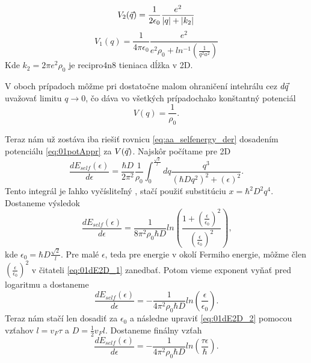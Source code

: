 \begin{equation}
\label{eq:01pot2D}
V_2(\vec{q})=\frac{1}{2\epsilon_0}\frac{e^2}{|q|+|k_2|}
\end{equation}
\begin{equation}
\label{eq:01pot1D}
V_1(q)=\frac{1}{4\pi\epsilon_0}\frac{e^2}{e^2\rho_0+ln^{-1}(\frac{1}{q^2a^2})}
\end{equation}
Kde  $k_2=2\pi e^2 \rho_0$  je recipro4n8 tieniaca dĺžka v 2D.  

V oboch prípadoch môžme pri dostatočne malom ohraničení intehrálu cez $d\vec{q}$ 
uvažovať limitu $q \to 0$, čo dáva vo všetkých prípadochako konštantný potenciál 
\begin{equation}
\label{eq:01potAppr}
V(q)=\frac{1}{\rho_0} \text{.}
\end{equation}

Teraz nám už zostáva iba riešiť rovnicu \eqref{eq:aa_selfenergy_der} dosadením potenciálu
\eqref{eq:01potAppr} za $V(\vec{q})$. Najskôr počítame pre 2D
\begin{equation}
 \frac{dE_{self}(\epsilon)}{d\epsilon}= \frac{\hbar D}{2\pi^2}\frac{1}{\rho_0} \int_0^{\frac{\sqrt{2}}{l}} dq \frac{ q^3}{(\hbar Dq^2)^2+(\epsilon)^2} \text{.}
\end{equation}
Tento integrál je ľahko vyčísliteľný , stačí použiť substitúciu $x=\hbar^2D^2q^4$. Dostaneme výsledok
\begin{equation}
\label{eq:01dE2D_1}
\frac{dE_{self}(\epsilon)}{d\epsilon}= \frac{1}{8\pi^2 \rho_0 \hbar D} ln (\frac{1+(\frac{\epsilon}{\epsilon_0})^2}{(\frac{\epsilon}
 {\epsilon_0})^2})\text{,}
\end{equation}
kde $\epsilon_0=\hbar D \frac{\sqrt 2}{l}$. Pre malé $\epsilon$, teda pre energie v okolí 
Fermiho energie, môžme člen $(\frac{\epsilon}{\epsilon_0})^2$ v čitateli  
\eqref{eq:01dE2D_1} zanedbať. Potom vieme exponent vyňať pred logaritmu a dostaneme
\begin{equation}
\label{eq:01dE2D_2}
\frac{dE_{self}(\epsilon)}{d\epsilon}= -\frac{1}{4\pi^2 \rho_0 \hbar D} ln(\frac{\epsilon}
{\epsilon_0})\text{.}
\end{equation}
Teraz nám stačí len dosadiť za $\epsilon_0$ a následne upraviť \eqref{eq:01dE2D_2}
 pomocou vzťahov $l=v_F\tau$ a $D=\frac{1}{2}v_F l$. Dostaneme finálny vzťah
 \begin{equation}
 \label{eq:01dE2Dfinal}
 \frac{dE_{self}(\epsilon)}{d\epsilon}= -\frac{1}{4\pi^2 \rho_0 \hbar D} ln(\frac{\tau\epsilon}
{\hbar})\text{.}
 \end{equation}
 
